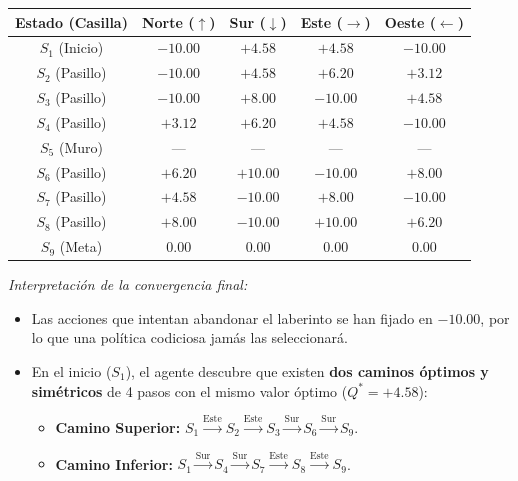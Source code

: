 \begin{center}
\small
\begin{tabular}{ccccc}
  \toprule
  \textbf{Estado (Casilla)} & \textbf{Norte ($\uparrow$)} & \textbf{Sur ($\downarrow$)} & \textbf{Este ($\rightarrow$)} & \textbf{Oeste ($\leftarrow$)} \\
  \midrule
  $S_1$ (Inicio)  & $-10.00$ & $\mathbf{+4.58}$ & $\mathbf{+4.58}$ & $-10.00$ \\
  $S_2$ (Pasillo) & $-10.00$ & $+4.58$          & $\mathbf{+6.20}$ & $+3.12$  \\
  $S_3$ (Pasillo) & $-10.00$ & $\mathbf{+8.00}$ & $-10.00$         & $+4.58$  \\
  $S_4$ (Pasillo) & $+3.12$  & $\mathbf{+6.20}$ & $+4.58$          & $-10.00$ \\
  $S_5$ (Muro)    & ---      & ---             & ---              & ---      \\
  $S_6$ (Pasillo) & $+6.20$  & $\mathbf{+10.00}$ & $-10.00$        & $+8.00$  \\
  $S_7$ (Pasillo) & $+4.58$  & $-10.00$         & $\mathbf{+8.00}$ & $-10.00$ \\
  $S_8$ (Pasillo) & $+8.00$  & $-10.00$         & $\mathbf{+10.00}$ & $+6.20$  \\
  $S_9$ (Meta)    & $0.00$   & $0.00$           & $0.00$           & $0.00$   \\
  \bottomrule
\end{tabular}
\end{center}
\textit{Interpretación de la convergencia final:}
\begin{itemize}
  \item Las acciones que intentan abandonar el laberinto se han fijado en $\mathbf{-10.00}$, por lo que una política codiciosa jamás las seleccionará.
  \item En el inicio ($S_1$), el agente descubre que existen \textbf{dos caminos óptimos y simétricos} de 4 pasos con el mismo valor óptimo ($Q^* = +4.58$):
  \begin{itemize}
    \item \textbf{Camino Superior:} $S_1 \xrightarrow{\text{Este}} S_2 \xrightarrow{\text{Este}} S_3 \xrightarrow{\text{Sur}} S_6 \xrightarrow{\text{Sur}} S_9$.
    \item \textbf{Camino Inferior:} $S_1 \xrightarrow{\text{Sur}} S_4 \xrightarrow{\text{Sur}} S_7 \xrightarrow{\text{Este}} S_8 \xrightarrow{\text{Este}} S_9$.
  \end{itemize}
\end{itemize}

